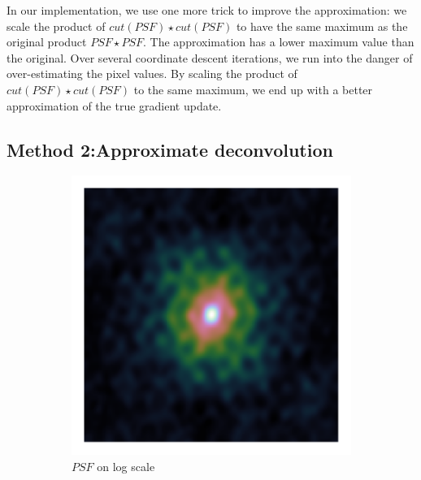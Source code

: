 In our implementation, we use one more trick to improve the approximation: we scale the product of $cut(PSF) \star cut(PSF)$ to have the same maximum as the original product $PSF \star PSF$. The approximation has a lower maximum value than the original. Over several coordinate descent iterations, we run into the danger of over-estimating the pixel values. By scaling the product of $cut(PSF) \star cut(PSF)$ to the same maximum, we end up with a better approximation of the true gradient update.

\subsection{Method 2:Approximate deconvolution}
\begin{figure}[h]
	\centering
	\begin{subfigure}[b]{0.3\linewidth}
		\includegraphics[width=\linewidth, clip, trim= 0.25in 0.25in 0.25in 0.25in]{./chapters/03.cd/simulated/psf.png}
		\caption{$PSF$ on log scale}
	\end{subfigure}
	\begin{subfigure}[b]{0.3\linewidth}

\end{subfigure}
\end{figure}
